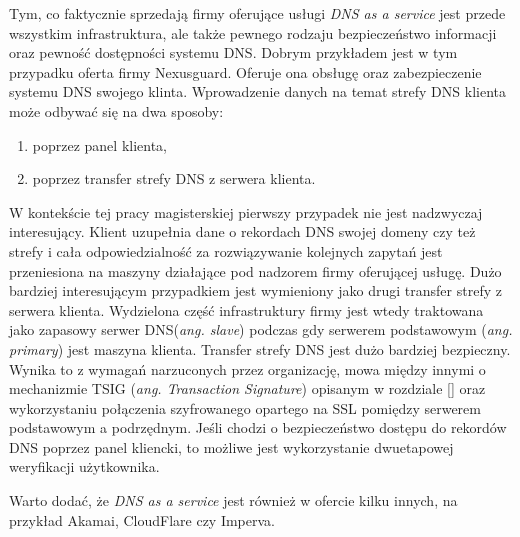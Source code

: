 Tym, co faktycznie sprzedają firmy oferujące usługi \textit{DNS as a service} jest przede wszystkim infrastruktura, ale także pewnego rodzaju bezpieczeństwo informacji oraz pewność dostępności systemu DNS. Dobrym przykładem jest w tym przypadku oferta firmy Nexusguard\cite{nexusguard}. Oferuje ona obsługę oraz zabezpieczenie systemu DNS swojego klinta. Wprowadzenie danych na temat strefy DNS klienta może odbywać się na dwa sposoby:
\begin{enumerate}
	\item poprzez panel klienta,
	\item poprzez transfer strefy DNS z serwera klienta.
\end{enumerate}
W kontekście tej pracy magisterskiej pierwszy przypadek nie jest nadzwyczaj interesujący. Klient uzupełnia dane o rekordach DNS swojej domeny czy też strefy i cała odpowiedzialność za rozwiązywanie kolejnych zapytań jest przeniesiona na maszyny działające pod nadzorem firmy oferującej usługę. Dużo bardziej interesującym przypadkiem jest wymieniony jako drugi transfer strefy z serwera klienta. Wydzielona część infrastruktury firmy jest wtedy traktowana jako zapasowy serwer DNS(\textit{ang. slave}) podczas gdy serwerem podstawowym (\textit{ang. primary}) jest maszyna klienta. Transfer strefy DNS jest dużo bardziej bezpieczny. Wynika to z wymagań narzuconych przez organizację, mowa między innymi o mechanizmie TSIG (\textit{ang. Transaction Signature})  opisanym w rozdziale \ref{} oraz wykorzystaniu połączenia szyfrowanego opartego na SSL pomiędzy serwerem podstawowym a podrzędnym. Jeśli chodzi o bezpieczeństwo dostępu do rekordów DNS poprzez panel kliencki, to możliwe jest wykorzystanie dwuetapowej weryfikacji użytkownika.

Warto dodać, że \textit{DNS as a service} jest również w ofercie kilku innych, na przykład Akamai\cite{akamai}, CloudFlare\cite{cloudflare} czy Imperva\cite{incapsula}.